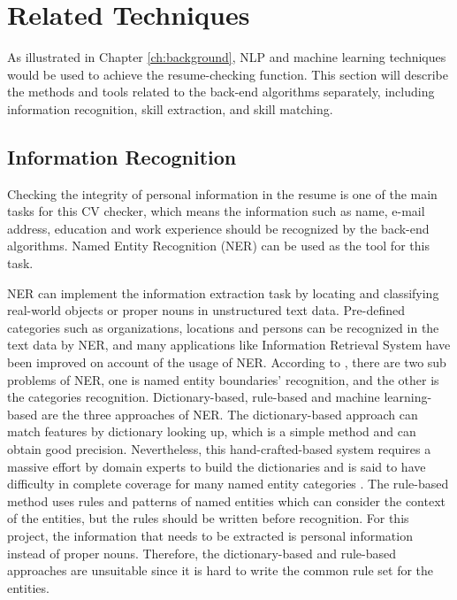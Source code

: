 \section{Related Techniques}
As illustrated in Chapter \ref{ch:background}, NLP and machine learning techniques would be used to achieve the resume-checking function. This section will describe the methods and tools related to the back-end algorithms separately, including information recognition, skill extraction, and skill matching.

\subsection{Information Recognition}

Checking the integrity of personal information in the resume is one of the main tasks for this CV checker, which means the information such as name, e-mail address, education and work experience should be recognized by the back-end algorithms. Named Entity Recognition (NER) can be used as the tool for this task.


NER can implement the information extraction task by locating and classifying real-world objects or proper nouns in unstructured text data. Pre-defined categories such as organizations, locations and persons can be recognized in the text data by NER, and many applications like Information Retrieval System \cite{khalid2008impact} have been improved on account of the usage of NER. According to \cite{mohit2014named}, there are two sub problems of NER, one is named entity boundaries' recognition, and the other is the categories recognition. Dictionary-based, rule-based and machine learning-based are the three approaches of NER. The dictionary-based approach can match features by dictionary looking up, which is a simple method and can obtain good precision. Nevertheless, this hand-crafted-based system requires a massive effort by domain experts to build the dictionaries and is said to have difficulty in complete coverage for many named entity categories \cite{neelakantan2015learning}. The rule-based method uses rules and patterns of named entities which can consider the context of the entities, but the rules should be written before recognition. For this project, the information that needs to be extracted is personal information instead of proper nouns. Therefore, the dictionary-based and rule-based approaches are unsuitable since it is hard to write the common rule set for the entities.

